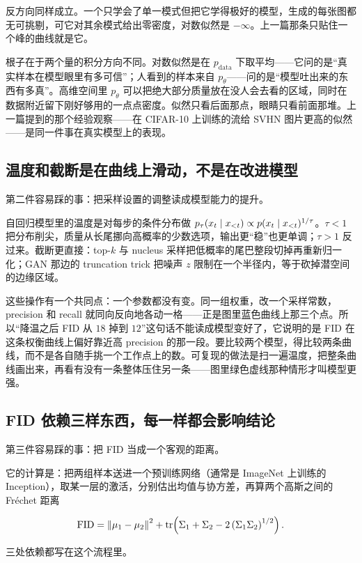 反方向同样成立。一个只学会了单一模式但把它学得极好的模型，生成的每张图都无可挑剔，可它对其余模式给出零密度，对数似然是 \(-\infty\)。上一篇那条只贴住一个峰的曲线就是它。

根子在于两个量的积分方向不同。对数似然是在 \(p_{\text{data}}\) 下取平均——它问的是``真实样本在模型眼里有多可信''；人看到的样本来自 \(p_\theta\)——问的是``模型吐出来的东西有多真''。高维空间里 \(p_\theta\) 可以把绝大部分质量放在没人会去看的区域，同时在数据附近留下刚好够用的一点点密度。似然只看后面那点，眼睛只看前面那堆。上一篇提到的那个经验观察——在 CIFAR-10 上训练的流给 SVHN 图片更高的似然——是同一件事在真实模型上的表现。

\subsection{温度和截断是在曲线上滑动，不是在改进模型}

第二件容易踩的事：把采样设置的调整读成模型能力的提升。

自回归模型里的温度是对每步的条件分布做 \(p_\tau(x_t\mid x_{<t})\propto p(x_t\mid x_{<t})^{1/\tau}\)。\(\tau<1\) 把分布削尖，质量从长尾挪向高概率的少数选项，输出更``稳''也更单调；\(\tau>1\) 反过来。截断更直接：top-\(k\) 与 nucleus 采样把低概率的尾巴整段切掉再重新归一化；GAN 那边的 truncation trick 把噪声 \(z\) 限制在一个半径内，等于砍掉潜空间的边缘区域。

这些操作有一个共同点：一个参数都没有变。同一组权重，改一个采样常数，precision 和 recall 就同向反向地各动一格——正是图里蓝色曲线上那三个点。所以``降温之后 FID 从 \(18\) 掉到 \(12\)''这句话不能读成模型变好了，它说明的是 FID 在这条权衡曲线上偏好靠近高 precision 的那一段。要比较两个模型，得比较两条曲线，而不是各自随手挑一个工作点上的数。可复现的做法是扫一遍温度，把整条曲线画出来，再看有没有一条整体压住另一条——图里绿色虚线那种情形才叫模型更强。

\subsection{FID 依赖三样东西，每一样都会影响结论}

第三件容易踩的事：把 FID 当成一个客观的距离。

它的计算是：把两组样本送进一个预训练网络（通常是 ImageNet 上训练的 Inception），取某一层的激活，分别估出均值与协方差，再算两个高斯之间的 Fréchet 距离

\[
\text{FID}=\left\lVert\mu_1-\mu_2\right\rVert^2+\operatorname{tr}\!\left(\Sigma_1+\Sigma_2-2\left(\Sigma_1\Sigma_2\right)^{1/2}\right).
\]

三处依赖都写在这个流程里。

